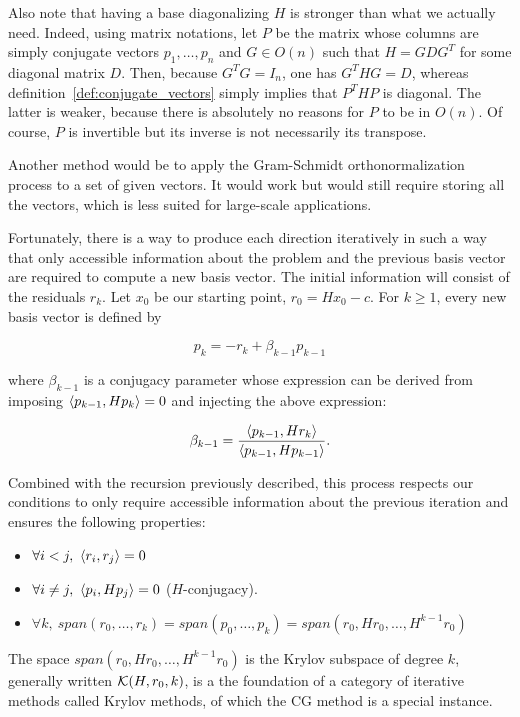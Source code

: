 \documentclass[10pt]{article}
\numberwithin{equation}{section}
\begin{document}
	Also note that having a base diagonalizing $H$ is stronger than what we actually need. Indeed, using matrix notations, let $P$ be the matrix whose columns are simply conjugate vectors $p_1,\ldots,p_n$ and $G \in O(n)$ such that $H=GDG^T$ for some diagonal matrix $D$. Then, because $G^TG=I_n$, one has $G^THG=D$, whereas definition~\ref{def:conjugate_vectors} simply implies that $P^THP$ is diagonal. The latter is weaker, because there is absolutely no reasons for $P$ to be in $O(n)$. Of course, $P$ is invertible but its inverse is not necessarily its transpose. 
	
	Another method would be to apply the Gram-Schmidt orthonormalization process to a set of given vectors. It would work but would still require storing all the vectors, which is less suited for large-scale applications. 
	
	Fortunately, there is a way to produce each direction iteratively in such a way that only accessible information about the problem and the previous basis vector are required to compute a new basis vector. The initial information will consist of the residuals $r_k$. Let $x_0$ be our starting point, $r_0=Hx_0-c$. For $k\ge 1$, every new basis vector is defined by
	
	\[p_k = -r_k + \beta_{k-1} p_{k-1}\]
	
	where $\beta_{k-1}$ is a conjugacy parameter whose expression can be derived from imposing $\left\langle {p_{k-1}} , {Hp_k} \right\rangle=0$ and injecting the above expression:
	
	\[ \beta_{k-1} = \dfrac{\left\langle {p_{k-1}} , {Hr_k} \right\rangle}{\left\langle {p_{k-1}} , {Hp_{k-1}} \right\rangle}.\]
	
	Combined with the recursion previously described, this process respects our conditions to only require accessible information about the previous iteration and ensures the following properties:
	\begin{itemize}
		\item $\forall i<j,\ \scal{r_i}{r_j}=0$
		\item $\forall i\neq j,\ \scal{p_i}{Hp_j}=0$ ($H$-conjugacy).
		\item $\forall k,\ span(r_0,\ldots,r_k) = span(p_0,\ldots,p_k) = span(r_0,Hr_0,\ldots,H^{k-1}r_0)$
	\end{itemize}
	
	The space $span(r_0,Hr_0,\ldots,H^{k-1}r_0)$ is the Krylov subspace of degree $k$, generally written ${\mathcal{K}}(H,r_0,k)$, is a the foundation of a category of iterative methods called Krylov methods, of which the CG method is a special instance. 
	
\end{document}
